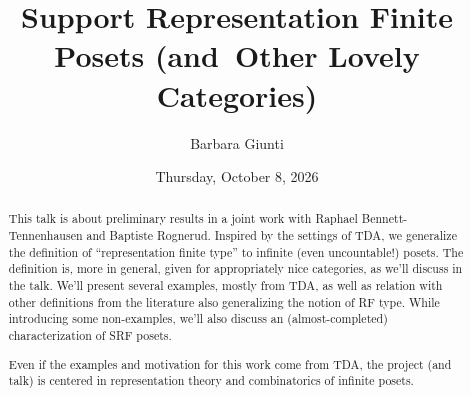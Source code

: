 \documentclass{UAmathtalk}
\author{Barbara Giunti}
\title{Support Representation Finite Posets (and~Other Lovely Categories)}
\date{Thursday, October 8, 2026}
\begin{document}
\maketitle

\begin{abstract}
This talk is about preliminary results in a joint work with Raphael Bennett-Tennenhausen and Baptiste Rognerud.
Inspired by the settings of TDA, we generalize the definition of ``representation finite type'' to infinite (even uncountable!) posets. The definition is, more in general, given for appropriately nice categories, as we'll discuss in the talk. We'll present several examples, mostly from TDA, as well as relation with other definitions from the literature also generalizing the notion of RF type.
While introducing some non-examples, we'll also discuss an (almost-completed) characterization of SRF posets.

Even if the examples and motivation for this work come from TDA, the project (and talk) is centered in representation theory and combinatorics of infinite posets.
\end{abstract}
\end{document}
